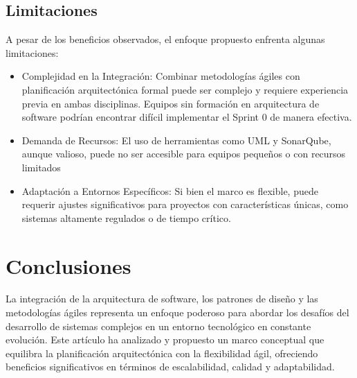 \documentclass[conference]{IEEEtran}
\begin{document}
\subsection{Limitaciones}
A pesar de los beneficios observados, el enfoque propuesto enfrenta algunas limitaciones:
\begin{itemize}
    \item Complejidad en la Integración: Combinar
    metodologías ágiles con planificación
    arquitectónica formal puede ser complejo y
    requiere experiencia previa en ambas disciplinas.
    Equipos sin formación en arquitectura de software
    podrían encontrar difícil implementar el Sprint 0 de
    manera efectiva.
    \item Demanda de Recursos: El uso de herramientas como
    UML y SonarQube, aunque valioso, puede no ser
    accesible para equipos pequeños o con recursos
    limitados
     \item Adaptación a Entornos Específicos: Si bien el marco
    es flexible, puede requerir ajustes significativos
    para proyectos con características únicas, como
    sistemas altamente regulados o de tiempo crítico.\\
\end{itemize}

\section{Conclusiones}
La integración de la arquitectura de software, los patrones de diseño y las metodologías ágiles representa un enfoque poderoso para abordar los desafíos del desarrollo de sistemas complejos en un entorno tecnológico en constante evolución. Este artículo ha analizado y propuesto un marco conceptual que equilibra la planificación arquitectónica con la flexibilidad ágil, ofreciendo beneficios significativos en términos de escalabilidad, calidad y adaptabilidad.\\
\end{document}
